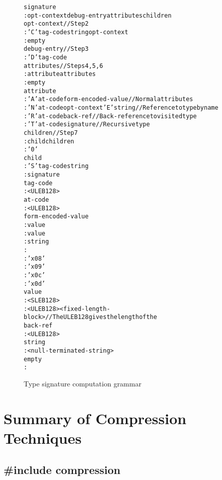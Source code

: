 \begin{figure}[h]
\begin{dwflisting}
\begin{alltt}
signature
    : opt-context debug-entry attributes children
opt-context           // Step 2
    : 'C' tag-code string opt-context
    : empty
debug-entry           // Step 3
    : 'D' tag-code
attributes            // Steps 4, 5, 6
    : attribute attributes
    : empty
attribute
    : 'A' at-code form-encoded-value     // Normal attributes
    : 'N' at-code opt-context 'E' string // Reference to type by name
    : 'R' at-code back-ref               // Back-reference to visited type
    : 'T' at-code signature              // Recursive type
children             //  Step 7
    : child children
    : '0'
child
    : 'S' tag-code string
    : signature
tag-code
    : <ULEB128>
at-code
    : <ULEB128>
form-encoded-value
    :  value 
    :  value 
    :  string 
    :   
 
    : 'x08'
  
    : 'x09'
 
    : 'x0c'
 
    : 'x0d'
value
    : <SLEB128>
    : <ULEB128> <fixed-length-block> // The ULEB128 gives the length of the 
back-ref
    : <ULEB128>
string
    : <null-terminated-string>
empty
    :
\end{alltt}
\end{dwflisting}
\caption{Type signature computation grammar}
\label{fig:typesignaturecomputationgrammar}
\end{figure}

\section{Summary of Compression Techniques}
\label{app:summaryofcompressiontechniques}
\subsection{\#include compression}
\label{app:includecompression}

